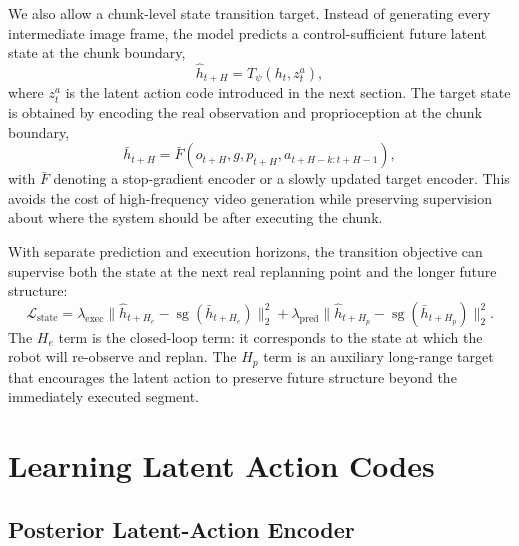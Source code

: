 \documentclass[10pt]{article}
\newcommand{\sg}{\operatorname{sg}}
\begin{document}
We also allow a chunk-level state transition target. Instead of generating every intermediate image frame, the model predicts a control-sufficient future latent state at the chunk boundary,
\begin{equation}
\hat{h}_{t+H}=T_\psi(h_t,z_t^a),
\label{eq:transition}
\end{equation}
where $z_t^a$ is the latent action code introduced in the next section. The target state is obtained by encoding the real observation and proprioception at the chunk boundary,
\begin{equation}
\bar{h}_{t+H}=\bar{F}(o_{t+H},g,p_{t+H},a_{t+H-k:t+H-1}),
\label{eq:target_state}
\end{equation}
with $\bar{F}$ denoting a stop-gradient encoder or a slowly updated target encoder. This avoids the cost of high-frequency video generation while preserving supervision about where the system should be after executing the chunk.

With separate prediction and execution horizons, the transition objective can
supervise both the state at the next real replanning point and the longer
future structure:
\begin{equation}
\mathcal{L}_{\mathrm{state}} =
\lambda_{\mathrm{exec}}\|\hat{h}_{t+H_e}-\sg(\bar{h}_{t+H_e})\|_2^2
+\lambda_{\mathrm{pred}}\|\hat{h}_{t+H_p}-\sg(\bar{h}_{t+H_p})\|_2^2.
\label{eq:dual_horizon_state_loss}
\end{equation}
The $H_e$ term is the closed-loop term: it corresponds to the state at which
the robot will re-observe and replan. The $H_p$ term is an auxiliary long-range
target that encourages the latent action to preserve future structure beyond
the immediately executed segment.

\section{Learning Latent Action Codes}

\subsection{Posterior Latent-Action Encoder}
\end{document}
